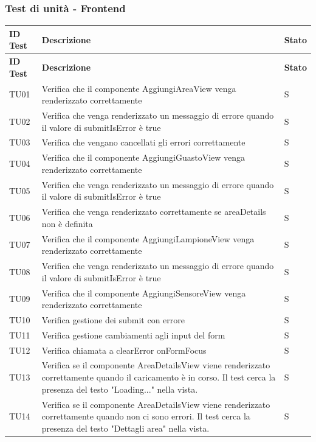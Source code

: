 \documentclass[12pt]{article}
\begin{document}
\subsubsection{Test di unità - Frontend}
\footnotesize
\begin{xltabular}{\linewidth}{|>{\hsize}X|X|>{\hsize}X|}

	\hline
	\textbf{ID Test} & \textbf{Descrizione} & \textbf{Stato} \\
	\hline
	\endfirsthead
	\hline
	\textbf{ID Test} & \textbf{Descrizione}  & \textbf{Stato} \\
	\hline
	\endhead
	\hline
	\endfoot
	TU01 & Verifica che il componente AggiungiAreaView venga renderizzato correttamente & S \\ \hline
	TU02 & Verifica che venga renderizzato un messaggio di errore quando il valore di submitIsError è true & S \\ \hline
	TU03 & Verifica che vengano cancellati gli errori correttamente & S \\ \hline
	TU04 & Verifica che il componente AggiungiGuastoView venga renderizzato correttamente & S \\ \hline
	TU05 & Verifica che venga renderizzato un messaggio di errore quando il valore di submitIsError è true & S \\ \hline
	TU06 & Verifica che venga renderizzato correttamente se areaDetails non è definita & S \\ \hline
	TU07 & Verifica che il componente AggiungiLampioneView venga renderizzato correttamente & S \\ \hline
	TU08 & Verifica che venga renderizzato un messaggio di errore quando il valore di submitIsError è true & S \\ \hline
	TU09 & Verifica che il componente AggiungiSensoreView venga renderizzato correttamente & S \\ \hline
	TU10 & Verifica gestione dei submit con errore & S \\ \hline
	TU11 & Verifica gestione cambiamenti agli input del form & S \\ \hline
	TU12 & Verifica chiamata a clearError onFormFocus & S \\ \hline
	TU13 & Verifica se il componente AreaDetailsView viene renderizzato correttamente quando il caricamento è in corso. Il test cerca la presenza del testo "Loading..." nella vista. & S \\ \hline
	TU14 & Verifica se il componente AreaDetailsView viene renderizzato correttamente quando non ci sono errori. Il test cerca la presenza del testo "Dettagli area" nella vista. & S \\ \hline

\end{xltabular}
\end{document}
